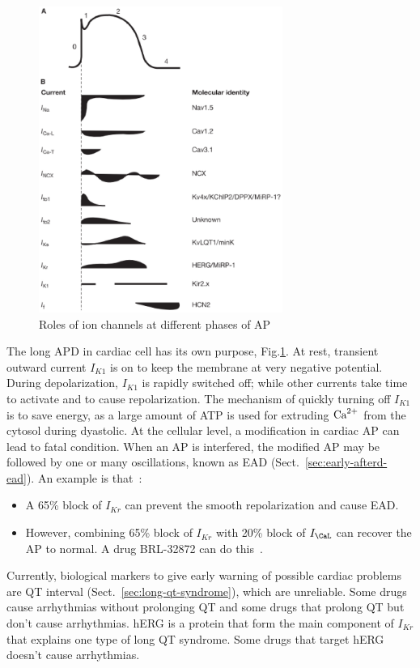 \begin{figure}[hbtp]
  \centerline{\includegraphics[height=10cm,
    angle=0]{./images/ion_channel_roles.eps}}
  \caption{Roles of ion channels at different phases of AP \citep{nass2008}}
  \label{fig:ion_channel_roles_AP}
\end{figure}

The long APD in cardiac cell has its own purpose,
Fig.\ref{fig:ion_channel_roles_AP}. At rest, transient outward current $I_{K1}$
is on to keep the membrane at very negative potential.
During depolarization, $I_{K1}$ is rapidly switched off; while other currents
take time to activate and to cause repolarization. The mechanism of quickly
turning off $I_{K1}$ is to save energy, as a large amount of ATP is used for
extruding ${\text{Ca}^{2+}}$ from the cytosol during dyastolic. At the cellular level, a
modification in cardiac AP can lead to fatal condition. When an AP is
interfered, the modified AP may be followed by one or many oscillations, known
as EAD (Sect.~\ref{sec:early-afterd-ead}).
An example is that~\citep{noble2008}:
\begin{itemize}
\item A 65\% block of $I_{Kr}$ can prevent the smooth repolarization
  and cause EAD.
\item However, combining 65\% block of $I_{Kr}$ with 20\% block of
  $I_\CaL$ can recover the AP to normal. A drug BRL-32872 can do
  this~\citep{bril1995}. 
\end{itemize}

Currently, biological markers to give early warning of possible cardiac problems
are QT interval (Sect.~\ref{sec:long-qt-syndrome}), which are unreliable. Some
drugs cause arrhythmias without prolonging QT and some drugs that prolong QT but
don't cause arrhythmias. hERG is a protein that form the main component of
$I_{Kr}$ that explains one type of long QT syndrome. Some drugs that target hERG
doesn't cause arrhythmias.


